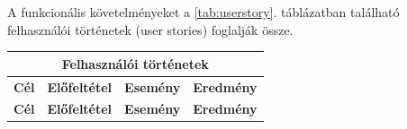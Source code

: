 A funkcionális követelményeket a \ref{tab:userstory}. táblázatban található felhasználói történetek (user stories) foglalják össze.

\begin{center}
\begin{longtable}{ | p{} | p{} | p{} | p{} | }

\hline
\multicolumn{4}{|c|}{\textbf{Felhasználói történetek}}
\\ \hline
\textbf{Cél} & \textbf{Előfeltétel} & \textbf{Esemény} & \textbf{Eredmény}
\\ \hline \hline
\endfirsthead

\hline
\textbf{Cél} & \textbf{Előfeltétel} & \textbf{Esemény} & \textbf{Eredmény}
\\ \hline \hline
\endhead


\end{longtable}
\end{center}
